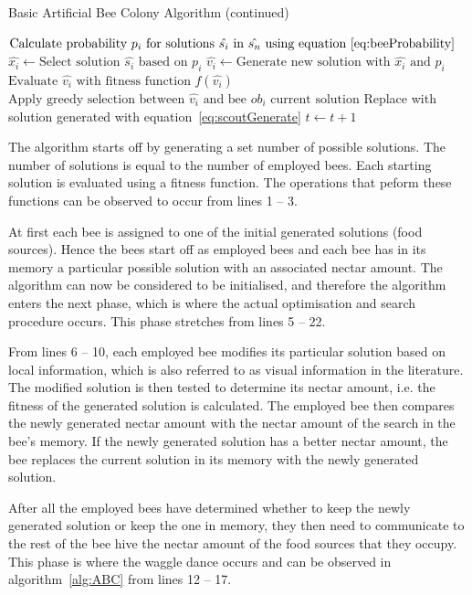 \begin{algorithm}
	\caption{Basic Artificial Bee Colony Algorithm (continued)}
	\label{alg:ABC1}
	\begin{algorithmic}[1]
    \State$\text{Calculate probability $p_i$ for solutions $\hat{s_i}$ in $\hat{s_n}$ using equation~\ref{eq:beeProbability}}$
				\State$\hat{x_i} \leftarrow \text{Select solution $\hat{s_i}$ based on $p_i$} $
				\State$\hat{v_i} \leftarrow \text{Generate new solution with $\hat{x_i}$ and $p_i$}$
				\State$\text{Evaluate $\hat{v_i}$ with fitness function $f(\hat{v_i})$}$
				\State$\text{Apply greedy selection between $\hat{v_i}$ and bee $ob_i$ current solution}$
			\EndFor
				\State Replace with solution generated with equation~\ref{eq:scoutGenerate}
			\EndIf
			\State$t \leftarrow t + 1$
		\EndWhile
	\end{algorithmic}
\end{algorithm}
The algorithm starts off by generating a set number of possible solutions. The number of solutions is equal to the number of employed bees. Each starting solution is evaluated using a fitness function. The operations that peform these functions can be observed to occur from lines 1 -- 3.

At first each bee is assigned to one of the initial generated solutions (food sources). Hence the bees start off as employed bees and each bee has in its memory a particular possible solution with an associated nectar amount. The algorithm can now be considered to be initialised, and therefore the algorithm enters the next phase, which is where the actual optimisation and search procedure occurs. This phase stretches from lines 5 -- 22.

From lines 6 -- 10, each employed bee modifies its particular solution based on local information, which is also referred to as visual information in the literature. The modified solution is then tested to determine its nectar amount, i.e. the fitness of the generated solution is calculated. The employed bee then compares the newly generated nectar amount with the nectar amount of the search in the bee's memory. If the newly generated solution has a better nectar amount, the bee replaces the current solution in its memory with the newly generated solution.

After all the employed bees have determined whether to keep the newly generated solution or keep the one in memory, they then need to communicate to the rest of the bee hive the nectar amount of the food sources that they occupy. This phase is where the waggle dance occurs and can be observed in algorithm~\ref{alg:ABC} from lines 12 -- 17.

